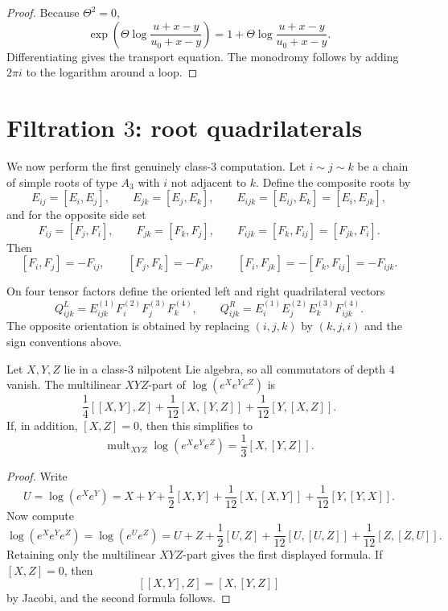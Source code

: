 \begin{proof}
Because $\Theta^2=0$,
\[
\exp\left(\Theta\log\!\frac{u+x-y}{u_0+x-y}\right)
=1+\Theta\log\!\frac{u+x-y}{u_0+x-y}.
\]
Differentiating gives the transport equation.  The monodromy follows by
adding $2\pi i$ to the logarithm around a loop.
\end{proof}

\section{Filtration $3$: root quadrilaterals}

We now perform the first genuinely class-$3$ computation.
Let $i\sim j\sim k$ be a chain of simple roots of type $A_3$ with
$i$ not adjacent to $k$.  Define the composite roots by
\[
E_{ij}=[E_i,E_j],
\qquad
E_{jk}=[E_j,E_k],
\qquad
E_{ijk}=[E_{ij},E_k]=[E_i,E_{jk}],
\]
and for the opposite side set
\[
F_{ij}=[F_j,F_i],
\qquad
F_{jk}=[F_k,F_j],
\qquad
F_{ijk}=[F_k,F_{ij}]=[F_{jk},F_i].
\]
Then
\[
[F_i,F_j]=-F_{ij},
\qquad
[F_j,F_k]=-F_{jk},
\qquad
[F_i,F_{jk}]=-[F_k,F_{ij}]=-F_{ijk}.
\]

\begin{definition}
On four tensor factors define the oriented left and right quadrilateral
vectors
\[
Q_{ijk}^{L}=E_{ijk}^{(1)}F_i^{(2)}F_j^{(3)}F_k^{(4)},
\qquad
Q_{ijk}^{R}=E_i^{(1)}E_j^{(2)}E_k^{(3)}F_{ijk}^{(4)}.
\]
The opposite orientation is obtained by replacing $(i,j,k)$ by
$(k,j,i)$ and the sign conventions above.
\end{definition}

\begin{lemma}
\ClaimStatusProvedHere
\label{lem:class3-ordered-bch}
Let $X,Y,Z$ lie in a class-$3$ nilpotent Lie algebra, so all
commutators of depth $4$ vanish.  The multilinear $XYZ$-part of
$\log(e^Xe^Ye^Z)$ is
\[
\frac14[[X,Y],Z]+\frac1{12}[X,[Y,Z]]+\frac1{12}[Y,[X,Z]].
\]
If, in addition, $[X,Z]=0$, then this simplifies to
\[
\operatorname{mult}_{XYZ}\log(e^Xe^Ye^Z)
=\frac13[X,[Y,Z]].
\]
\end{lemma}

\begin{proof}
Write
\[
U=\log(e^Xe^Y)=X+Y+\frac12[X,Y]+\frac1{12}[X,[X,Y]]
+\frac1{12}[Y,[Y,X]].
\]
Now compute
\[
\log(e^Xe^Ye^Z)=\log(e^Ue^Z)
=U+Z+\frac12[U,Z]+\frac1{12}[U,[U,Z]]+\frac1{12}[Z,[Z,U]].
\]
Retaining only the multilinear $XYZ$-part gives the first displayed
formula.  If $[X,Z]=0$, then
\[
[[X,Y],Z]=[X,[Y,Z]]
\]
by Jacobi, and the second formula follows.
\end{proof}

